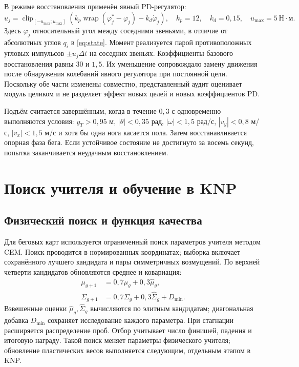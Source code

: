 \documentclass[11pt,a4paper]{article}
\newcommand{\clip}{\operatorname{clip}}
\newcommand{\wrap}{\operatorname{wrap}}
\begin{document}
В режиме восстановления применён явный PD-регулятор:
\begin{equation}
 u_j=\clip_{[-u_{\max};u_{\max}]}
 \left(k_p\wrap(\varphi_j^*-\varphi_j)-k_d\dot\varphi_j\right),
 \quad k_p=12,\quad k_d=0{,}15,\quad u_{\max}=5\ \text{Н}\!\cdot\!\text{м}.
 \label{eq:pd}
\end{equation}
Здесь $\varphi_j$ \textemdash{} относительный угол между соседними звеньями, в отличие от абсолютных углов $q_i$ в \eqref{eq:state}. Момент реализуется парой противоположных угловых импульсов $\pm u_j\Delta t$ на соседних звеньях. Коэффициенты базового восстановления равны $30$ и $1{,}5$. Их уменьшение сопровождало замену движения после обнаружения колебаний явного регулятора при постоянной цели. Поскольку обе части изменены совместно, представленный аудит оценивает модуль целиком и не разделяет эффект новых целей и новых коэффициентов PD.

Подъём считается завершённым, когда в течение $0{,}3$ с одновременно выполняются условия: $y_T>0{,}95$ м, $|\theta|<0{,}35$ рад, $|\omega|<1{,}5$ рад/с, $|v_y|<0{,}8$ м/с, $|v_x|<1{,}5$ м/с и хотя бы одна нога касается пола. Затем восстанавливается опорная фаза бега. Если устойчивое состояние не достигнуто за восемь секунд, попытка заканчивается неудачным восстановлением.

\section{Поиск учителя и обучение в KNP}
\subsection{Физический поиск и функция качества}
Для беговых карт используется ограниченный поиск параметров учителя методом CEM. Поиск проводится в нормированных координатах; выборка включает сохранённого лучшего кандидата и пары симметричных возмущений. По верхней четверти кандидатов обновляются среднее и ковариация:
\begin{align}
 \mu_{g+1}&=0{,}7\mu_g+0{,}3\widehat\mu_g,\nonumber\\
 \Sigma_{g+1}&=0{,}7\Sigma_g+0{,}3\widehat\Sigma_g+D_{\min}.
 \label{eq:cem}
\end{align}
Взвешенные оценки $\widehat\mu_g,\widehat\Sigma_g$ вычисляются по элитным кандидатам; диагональная добавка $D_{\min}$ сохраняет исследование каждого параметра. При стагнации расширяется распределение проб. Отбор учитывает число финишей, падения и итоговую награду. Такой поиск меняет параметры физического учителя; обновление пластических весов выполняется следующим, отдельным этапом в KNP.
\end{document}
